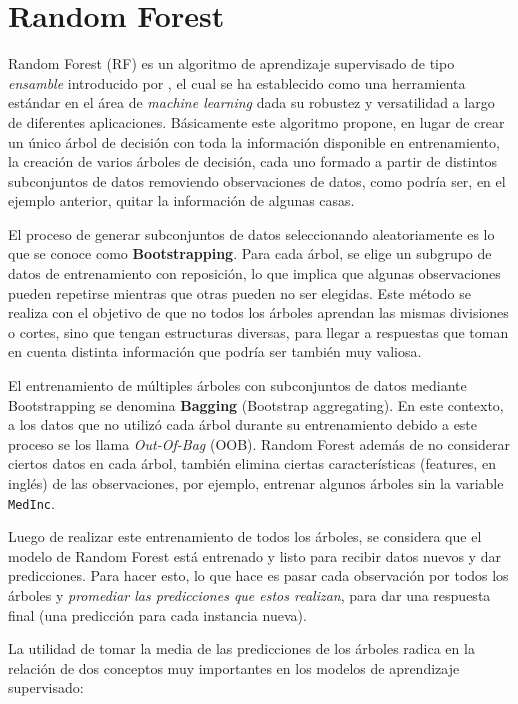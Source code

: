 \section{Random Forest}

Random Forest (RF) es un algoritmo de aprendizaje supervisado de tipo \textit{ensamble} introducido por \cite{breimanRF}, el cual se ha establecido como una herramienta estándar en el área de \textit{machine learning} dada su robustez y versatilidad a largo de diferentes aplicaciones. Básicamente este algoritmo propone, en lugar de crear un único árbol de decisión con toda la información disponible en entrenamiento, la creación de varios árboles de decisión, cada uno formado a partir de distintos subconjuntos de datos removiendo observaciones de datos, como podría ser, en el ejemplo anterior, quitar la información de algunas casas.

El proceso de generar subconjuntos de datos seleccionando aleatoriamente es lo que se conoce como \textbf{Bootstrapping}. Para cada árbol, se elige un subgrupo de datos de entrenamiento con reposición, lo que implica que algunas observaciones pueden repetirse mientras que otras pueden no ser elegidas. Este método se realiza con el objetivo de que no todos los árboles aprendan las mismas divisiones o cortes, sino que tengan estructuras diversas, para llegar a respuestas que toman en cuenta distinta información que podría ser también muy valiosa.

El entrenamiento de múltiples árboles con subconjuntos de datos mediante Bootstrapping se denomina \textbf{Bagging} (Bootstrap aggregating). En este contexto, a los datos que no utilizó cada árbol durante su entrenamiento debido a este proceso se los llama \textit{Out-Of-Bag} (OOB). Random Forest además de no considerar ciertos datos en cada árbol, también elimina ciertas características (features, en inglés) de las observaciones, por ejemplo, entrenar algunos árboles sin la variable \texttt{MedInc}.

Luego de realizar este entrenamiento de todos los árboles, se considera que el modelo de Random Forest está entrenado y listo para recibir datos nuevos y dar predicciones. Para hacer esto, lo que hace es pasar cada observación por todos los árboles y \textit{promediar las predicciones que estos realizan}, para dar una respuesta final (una predicción para cada instancia nueva).

La utilidad de tomar la media de las predicciones de los árboles radica en la relación de dos conceptos muy importantes en los modelos de aprendizaje supervisado:

